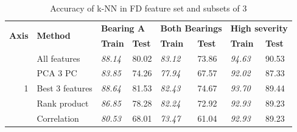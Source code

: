 \documentclass{llncs}
\begin{document}
\begin{table}
\centering
\caption{Accuracy of k-NN in FD feature set and subsets of 3}
\label{tab:fsel-methods-fd}
\begin{tabular}{|r|l|p{1.2cm}|p{1.2cm}|p{1.2cm}|p{1.2cm}|p{1.2cm}|p{1.2cm}|}
\hline
\multicolumn{1}{|l|}{\multirow{2}{*}{\textbf{Axis}}} & \multicolumn{1}{l|}{\multirow{2}{*}{\textbf{Method}}} & \multicolumn{2}{l|}{\textbf{Bearing A}}                                  & \multicolumn{2}{l|}{\textbf{Both Bearings}}                              & \multicolumn{2}{l|}{\textbf{High severity}}                              \\ \cline{3-8} 
\multicolumn{1}{|l|}{}                               & \multicolumn{1}{l|}{}                                 & \multicolumn{1}{l|}{\textbf{Train}} & \multicolumn{1}{l|}{\textbf{Test}} & \multicolumn{1}{l|}{\textbf{Train}} & \multicolumn{1}{l|}{\textbf{Test}} & \multicolumn{1}{l|}{\textbf{Train}} & \multicolumn{1}{l|}{\textbf{Test}} \\ \hline
\multirow{7}{*}{1}                                   & All features                                          & \textit{88.14}                      & 80.02                              & \textit{83.12}                      & 73.86                              & \textit{94.63}                      & 90.53                              \\
                                                     & PCA 3 PC                                              & \textit{83.85}                      & 74.26                              & \textit{77.94}                      & 67.57                              & \textit{92.02}                      & 87.33                              \\
                                                     & Best 3 features                                       & \textit{88.64}                      & 81.53                              & \textit{82.43}                      & 74.67                              & \textit{93.70}                      & 89.44                              \\
                                                     & Rank product                                          & \textit{86.85}                      & 78.28                              & \textit{82.24}                      & 72.92                              & \textit{92.93}                      & 89.23                              \\
                                                     & Correlation                                           & \textit{80.53}                      & 68.01                              & \textit{73.47}                      & 61.04                              & \textit{92.93}                      & 89.23                              \\

\end{tabular}
\end{table}
\end{document}
